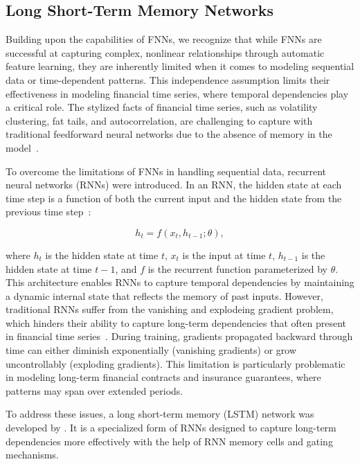 \subsection{Long Short-Term Memory Networks}

Building upon the capabilities of FNNs, we recognize that while FNNs are successful at capturing complex, nonlinear relationships through automatic feature learning, they are inherently limited when it comes to modeling sequential data or time-dependent patterns. 
This independence assumption limits their effectiveness in modeling financial time series, where temporal dependencies play a critical role. 
The stylized facts of financial time series, such as volatility clustering, fat tails, and autocorrelation, are challenging to capture with traditional feedforward neural networks due to the absence of memory in the model~\citep{cont2001empirical}.

To overcome the limitations of FNNs in handling sequential data, recurrent neural networks (RNNs) were introduced.
In an RNN, the hidden state at each time step is a function of both the current input and the hidden state from the previous time step~\citep{elman1990finding}:

\begin{equation}
    h_t = f(x_t, h_{t-1}; \theta),
\end{equation}

where $h_t$ is the hidden state at time $t$, $x_t$ is the input at time $t$, $h_{t-1}$ is the hidden state at time $t-1$, and $f$ is the recurrent function parameterized by $\theta$.
This architecture enables RNNs to capture temporal dependencies by maintaining a dynamic internal state that reflects the memory of past inputs.
However, traditional RNNs suffer from the vanishing and explodeing gradient problem, which hinders their ability to capture long-term dependencies that often present in financial time series~\citep{bengio1994learning}.
During training, gradients propagated backward through time can either diminish exponentially (vanishing gradients) or grow uncontrollably (exploding gradients).
This limitation is particularly problematic in modeling long-term financial contracts and insurance guarantees, where patterns may span over extended periods.

To address these issues, a long short-term memory (LSTM) network was developed by \citet{hochreiter1997long}.
It is a specialized form of RNNs designed to capture long-term dependencies more effectively with the help of RNN memory cells and gating mechanisms.

